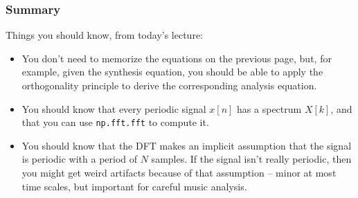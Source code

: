 \documentclass{beamer}
\begin{document}
\begin{frame}
  \frametitle{Summary}
  Things you should know, from today's lecture:
  \begin{itemize}
  \item You don't need to memorize the equations on the previous page,
    but, for example, given the synthesis equation, you should be able
    to apply the orthogonality principle to derive the corresponding
    analysis equation.
  \item You should know that every periodic signal $x[n]$ has a
    spectrum $X[k]$, and that you can use {\tt np.fft.fft} to compute
    it.
  \item You should know that the DFT makes an implicit assumption that
    the signal is periodic with a period of $N$ samples.  If the
    signal isn't really periodic, then you might get weird artifacts
    because of that assumption -- minor at most time scales, but
    important for careful music analysis.
  \end{itemize}
\end{frame}
        
\end{document}
